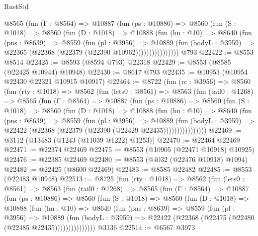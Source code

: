 \begin{lexlean}{RustStd}
\begin{coremodule}
            @8565
              (fun (Γ : @8564) =>
              @10887
                (fun (ps : @10886) =>
                @8560
                  (fun (S : @1018) =>
                  @8560
                    (fun (D : @1018) =>
                    @10888
                      (fun (hn : @10) =>
                      @8640
                        (fun (pns : @8639) =>
                        @8559
                          (fun (pl : @3956) =>
                          @10889
                            (fun (bodyL : @3959) =>
                            @22365 (@22368 (@22379 (@22390 @10962))))))))))))))))
    @793
@22422 := @8553 @8514
@22425 := @8593 (@8594 @793) @22318
@22429 := @8553 (@8585 (@22425 @10944) @10948)
@22430 := @8617 @793
@22435 := @10953 (@10954 @22430 @22321 @10915 @10917)
@22464 := @8722
    (fun (rc : @3956) =>
    @8560
      (fun (rty : @1018) =>
      @8562
        (fun (lets0 : @8561) =>
        @8563
          (fun (tail0 : @1268) =>
          @8565
            (fun (Γ : @8564) =>
            @10887
              (fun (ps : @10886) =>
              @8560
                (fun (S : @1018) =>
                @8560
                  (fun (D : @1018) =>
                  @10888
                    (fun (hn : @10) =>
                    @8640
                      (fun (pns : @8639) =>
                      @8559
                        (fun (pl : @3956) =>
                        @10889
                          (fun (bodyL : @3959) =>
                          @22422 (@22368 (@22379 (@22390 (@22429 @22435))))))))))))))))
@22469 := @3112 (@13483 (@1243 (@11039 @1222) @1253))
@22470 := @22464 @22469
@22471 := @22374 @22469
@22475 := @8553 (@10905 (@22471 @10918) @10925)
@22476 := @22385 @22469
@22480 := @8553 (@4032 (@22476 @10918) @1094)
@22482 := @22425 (@8600 @22469)
@22483 := @8585 @22482
@22485 := @8553 (@22483 @10948)
@22513 := @8725
    (fun (rty : @1018) =>
    @8562
      (fun (lets0 : @8561) =>
      @8563
        (fun (tail0 : @1268) =>
        @8565
          (fun (Γ : @8564) =>
          @10887
            (fun (ps : @10886) =>
            @8560
              (fun (S : @1018) =>
              @8560
                (fun (D : @1018) =>
                @10888
                  (fun (hn : @10) =>
                  @8640
                    (fun (pns : @8639) =>
                    @8559
                      (fun (pl : @3956) =>
                      @10889
                        (fun (bodyL : @3959) =>
                        @22422 (@22368 (@22475 (@22480 (@22485 @22435)))))))))))))))
    @3136
@22514 := @6567 @3973

\end{coremodule}
\end{lexlean}
